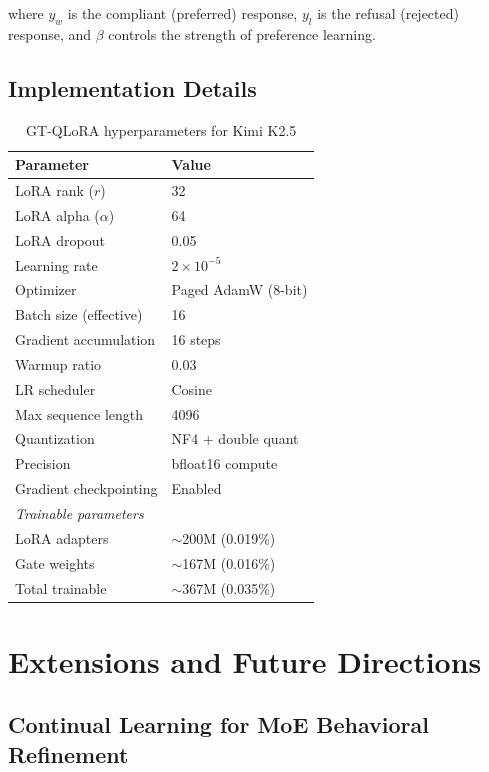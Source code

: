 \documentclass[11pt,a4paper]{article}
\begin{document}
where $y_w$ is the compliant (preferred) response, $y_l$ is the refusal (rejected) response, and $\beta$ controls the strength of preference learning.

\subsection{Implementation Details}

\begin{table}[h]
\centering
\caption{GT-QLoRA hyperparameters for Kimi K2.5}
\label{tab:hyperparams}
\begin{tabular}{ll}
\toprule
\textbf{Parameter} & \textbf{Value} \\
\midrule
LoRA rank ($r$) & 32 \\
LoRA alpha ($\alpha$) & 64 \\
LoRA dropout & 0.05 \\
Learning rate & $2 \times 10^{-5}$ \\
Optimizer & Paged AdamW (8-bit) \\
Batch size (effective) & 16 \\
Gradient accumulation & 16 steps \\
Warmup ratio & 0.03 \\
LR scheduler & Cosine \\
Max sequence length & 4096 \\
Quantization & NF4 + double quant \\
Precision & bfloat16 compute \\
Gradient checkpointing & Enabled \\
\midrule
\multicolumn{2}{l}{\textit{Trainable parameters}} \\
LoRA adapters & $\sim$200M (0.019\%) \\
Gate weights & $\sim$167M (0.016\%) \\
Total trainable & $\sim$367M (0.035\%) \\
\bottomrule
\end{tabular}
\end{table}

\section{Extensions and Future Directions}

\subsection{Continual Learning for MoE Behavioral Refinement}
\end{document}
